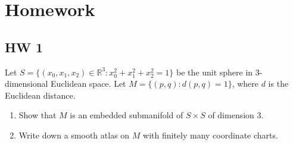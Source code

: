 \documentclass{article}
\theoremstyle{definition}
\begin{document}
\newpage

\section{Homework}

\subsection{HW 1}

Let $S=\{(x_0, x_1, x_2)\in\mathbb{R}^3: x_0^2+x_1^2+x_2^2=1\}$ be the unit sphere in 3-dimensional Euclidean space. Let $M=\{(p, q): d(p, q)=1\}$, where $d$ is the Euclidean distance.

\begin{enumerate}[(1)]
    \item Show that $M$ is an embedded submanifold of $S\times S$ of dimension $3$.
    \item Write down a smooth atlas on $M$ with finitely many coordinate charts. 
\end{enumerate}
\end{document}

